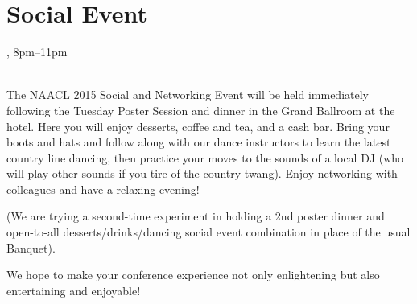 \clearpage
\section{Social Event}
\setheaders{}{\daydateyear}

\begin{center}



\daydateyear, 8pm--11pm \vspace{1em}\\
\BanquetLoc\\
\end{center}

The NAACL 2015 Social and Networking Event will be held immediately
following the Tuesday Poster Session and dinner in the Grand Ballroom
at the hotel. Here you will enjoy desserts, coffee and tea, and a cash
bar. Bring your boots and hats and follow along with our dance
instructors to learn the latest country line dancing, then practice
your moves to the sounds of a local DJ (who will play other sounds if
you tire of the country twang).  Enjoy networking with colleagues and
have a relaxing evening!

(We are trying a second-time experiment in holding a 2nd poster dinner and open-to-all desserts/drinks/dancing social event combination in place of the usual Banquet). 

We hope to make your conference experience not only enlightening but also entertaining and enjoyable!
